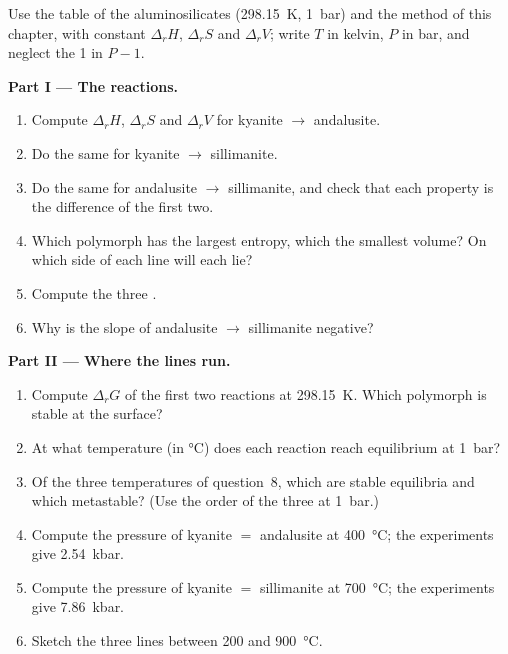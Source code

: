 \begin{problem}
\label{pb:b2:metamorphic-facies:1}
Use the table of the aluminosilicates (\qty{298.15}{K}, \qty{1}{bar}) and the method of
this chapter, with constant $\Delta_r H$, $\Delta_r S$ and $\Delta_r V$; write $T$ in
kelvin, $P$ in bar, and neglect the 1 in $P - 1$.

\noindent\textbf{Part I --- The reactions.}
\begin{enumerate}
\item Compute $\Delta_r H$, $\Delta_r S$ and $\Delta_r V$ for kyanite $\to$ andalusite.
\item Do the same for kyanite $\to$ sillimanite.
\item Do the same for andalusite $\to$ sillimanite, and check that each property is the
difference of the first two.
\item Which polymorph has the largest entropy, which the smallest volume? On which side
of each line will each lie?
\item Compute the three .
\item Why is the slope of andalusite $\to$ sillimanite negative?
\end{enumerate}

\noindent\textbf{Part II --- Where the lines run.}
\begin{enumerate}[resume]
\item Compute $\Delta_r G$ of the first two reactions at \qty{298.15}{K}. Which
polymorph is stable at the surface?
\item At what temperature (in \unit{\celsius}) does each reaction reach equilibrium at
\qty{1}{bar}?
\item Of the three temperatures of question~8, which are stable equilibria and which
metastable? (Use the order of the three at \qty{1}{bar}.)
\item Compute the pressure of kyanite $=$ andalusite at \qty{400}{\celsius}; the
experiments give \qty{2.54}{kbar}.
\item Compute the pressure of kyanite $=$ sillimanite at \qty{700}{\celsius}; the
experiments give \qty{7.86}{kbar}.
\item Sketch the three lines between 200 and \qty{900}{\celsius}.
\end{enumerate}


\end{problem}
